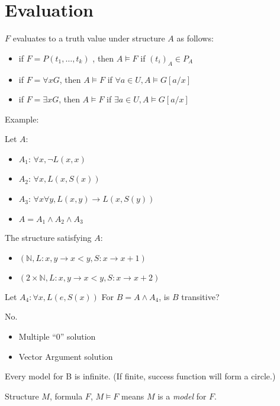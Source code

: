 \section{Evaluation}

$F$ evaluates to a truth value under structure $A$ as follows:

\begin{itemize}
\item
  if \(F = P(t_1,\dots,t_k)\) , then \(A \models F\) if \((t_i)_A \in P_A\)
\item
  if \(F = \forall x G\), then \(A \models F\) if
  \(\forall a \in U, A \models G [a / x] \)
\item
  if \(F = \exists x G\), then \(A \models F\) if \(\exists a \in U, A \models G[a / x]\)
\end{itemize}

Example:

Let $A$:

\begin{itemize}
\item
  \(A_1\): \(\forall x, \neg L(x,x)\)
\item
  \(A_2\): \(\forall x, L(x,S(x))\)
\item
  \(A_3\): \(\forall x\forall y, L(x,y) \rightarrow L(x, S(y))\)
\item
  \(A = A_1 \land A_2 \land A_3\)
\end{itemize}

The structure satisfying $A$:

\begin{itemize}
\item
  \((\mathbb{N}, L:x,y \rightarrow x<y,S: x \rightarrow x+1)\)
\item
  \((2\times\mathbb{N}, L:x,y \rightarrow x<y,S: x \rightarrow x+2)\)
\end{itemize}

Let \(A_4: \forall x, L(e, S(x))\) For \(B = A \land A_4\), is $B$ transitive?

No.

\begin{itemize}
\item
  Multiple ``0'' solution
\item
  Vector Argument solution
\end{itemize}

Every model for B is infinite. (If finite, success function will form a
circle.)

\begin{definition}[Model]
Structure $M$, formula $F$, $M \models F$ means $M$ is a \emph{model} for $F$.
\end{definition}

